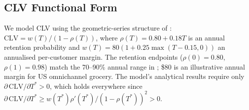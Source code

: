 \documentclass[msom,dblanonrev]{informs4}
\begin{document}
\subsection{CLV Functional Form}

We model CLV using the geometric-series structure of \citet{gupta2004valuing}: $\mathrm{CLV} = w(T) / (1 - \rho(T))$, where $\rho(T) = 0.80 + 0.18T$ is an annual retention probability and $w(T) = 80(1 + 0.25\max(T-0.15, 0))$ an annualised per-customer margin. The retention endpoints ($\rho(0) = 0.80$, $\rho(1) = 0.98$) match the 70--90\% annual range in \citet{gupta2004valuing}; \$80 is an illustrative annual margin for US omnichannel grocery. The model's analytical results require only $\partial\,\mathrm{CLV}/\partial T^* > 0$, which holds everywhere since $\partial\,\mathrm{CLV}/\partial T^* \geq w(T^*)\rho'(T^*)/(1-\rho(T^*))^2 > 0$.




\OneAndAHalfSpacedXI
\end{document}
